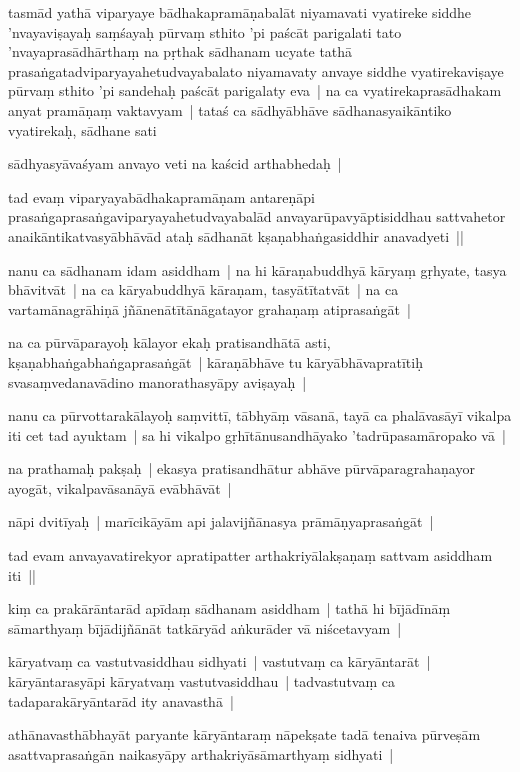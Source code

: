 \documentclass[article,12pt,a4paper]{memoir}
\begin{document}
	  \pstart tasmād yathā viparyaye bādhakapramāṇabalāt niyamavati vyatireke siddhe 'nvayaviṣayaḥ saṃśayaḥ pūrvaṃ sthito 'pi paścāt parigalati tato 'nvayaprasādhārthaṃ na pṛthak sādhanam ucyate tathā prasaṅgatadviparyayahetudvayabalato niyamavaty anvaye siddhe vyatirekaviṣaye pūrvaṃ sthito 'pi sandehaḥ paścāt parigalaty eva | na ca vyatirekaprasādhakam anyat pramāṇaṃ vaktavyam | tataś ca sādhyābhāve sādhanasyaikāntiko vyatirekaḥ, sādhane sati
	\pend
      

	  \pstart sādhyasyāvaśyam anvayo veti na kaścid arthabhedaḥ |
	\pend
      

	  \pstart tad evaṃ viparyayabādhakapramāṇam antareṇāpi prasaṅgaprasaṅgaviparyayahetudvayabalād anvayarūpavyāptisiddhau sattvahetor anaikāntikatvasyābhāvād ataḥ sādhanāt kṣaṇabhaṅgasiddhir anavadyeti ||
	\pend
      

	  \pstart nanu ca sādhanam idam asiddham | na hi kāraṇabuddhyā kāryaṃ gṛhyate, tasya bhāvitvāt | na ca kāryabuddhyā \leavevmode{} kāraṇam, tasyātītatvāt | na ca vartamānagrāhiṇā jñānenātītānāgatayor grahaṇaṃ atiprasaṅgāt |
	\pend
      

	  \pstart na ca pūrvāparayoḥ kālayor ekaḥ pratisandhātā asti, kṣaṇabhaṅgabhaṅgaprasaṅgāt | kāraṇābhāve tu kāryābhāvapratītiḥ svasaṃvedanavādino manorathasyāpy aviṣayaḥ |
	\pend
      

	  \pstart nanu ca pūrvottarakālayoḥ saṃvittī, tābhyāṃ vāsanā, tayā ca phalāvasāyī vikalpa iti cet tad ayuktam | sa hi vikalpo gṛhītānusandhāyako 'tadrūpasamāropako vā |
	\pend
      

	  \pstart na prathamaḥ pakṣaḥ | ekasya pratisandhātur abhāve pūrvāparagrahaṇayor ayogāt, vikalpavāsanāyā evābhāvāt |
	\pend
      

	  \pstart nāpi dvitīyaḥ | marīcikāyām api jalavijñānasya prāmāṇyaprasaṅgāt |
	\pend
      

	  \pstart tad evam anvayavatirekyor apratipatter arthakriyālakṣaṇaṃ sattvam asiddham iti || 
	\pend
      

	  \pstart kiṃ ca prakārāntarād apīdaṃ sādhanam asiddham | tathā hi bījādīnāṃ sāmarthyaṃ bījādijñānāt tatkāryād aṅkurāder vā niścetavyam |
	\pend
      

	  \pstart kāryatvaṃ ca vastutvasiddhau sidhyati | vastutvaṃ ca kāryāntarāt | kāryāntarasyāpi kāryatvaṃ vastutvasiddhau | tadvastutvaṃ ca tadaparakāryāntarād ity anavasthā |
	\pend
      

	  \pstart athānavasthābhayāt paryante kāryāntaraṃ nāpekṣate tadā tenaiva pūrveṣām asattvaprasaṅgān naikasyāpy arthakriyāsāmarthyaṃ sidhyati |
	\pend
      
\end{document}
